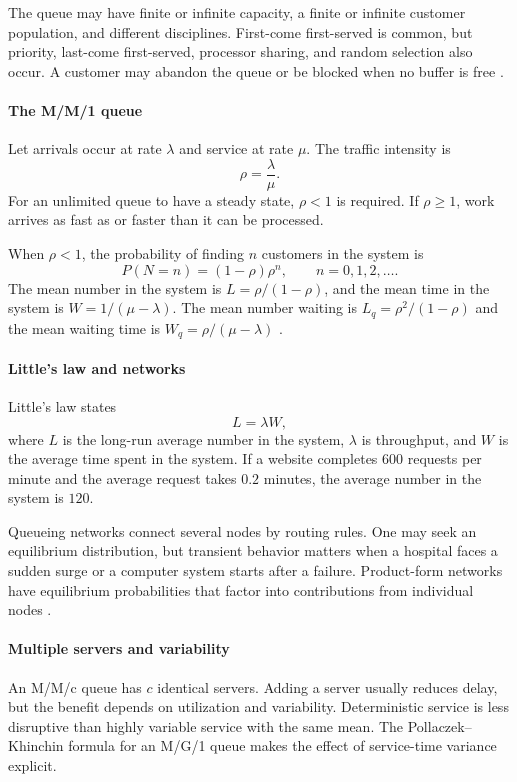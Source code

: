 The queue may have finite or infinite capacity, a finite or infinite customer population, and different disciplines. First-come first-served is common, but priority, last-come first-served, processor sharing, and random selection also occur. A customer may abandon the queue or be blocked when no buffer is free \cite{queue_ref1,queue_ref4}.

\paragraph{The M/M/1 queue}
Let arrivals occur at rate $\lambda$ and service at rate $\mu$. The traffic intensity is
\[
\rho=\frac{\lambda}{\mu}.
\]
For an unlimited queue to have a steady state, $\rho<1$ is required. If $\rho\geq1$, work arrives as fast as or faster than it can be processed.

When $\rho<1$, the probability of finding $n$ customers in the system is
\[
P(N=n)=(1-\rho)\rho^n,\qquad n=0,1,2,\ldots.
\]
The mean number in the system is $L=\rho/(1-\rho)$, and the mean time in the system is $W=1/(\mu-\lambda)$. The mean number waiting is $L_q=\rho^2/(1-\rho)$ and the mean waiting time is $W_q=\rho/(\mu-\lambda)$ \cite{queue_ref1}.

\paragraph{Little's law and networks}
Little's law states
\[
L=\lambda W,
\]
where $L$ is the long-run average number in the system, $\lambda$ is throughput, and $W$ is the average time spent in the system. If a website completes $600$ requests per minute and the average request takes $0.2$ minutes, the average number in the system is $120$.

Queueing networks connect several nodes by routing rules. One may seek an equilibrium distribution, but transient behavior matters when a hospital faces a sudden surge or a computer system starts after a failure. Product-form networks have equilibrium probabilities that factor into contributions from individual nodes \cite{queue_ref2,queue_ref3}.

\paragraph{Multiple servers and variability}
An M/M/c queue has $c$ identical servers. Adding a server usually reduces delay, but the benefit depends on utilization and variability. Deterministic service is less disruptive than highly variable service with the same mean. The Pollaczek--Khinchin formula for an M/G/1 queue makes the effect of service-time variance explicit.

